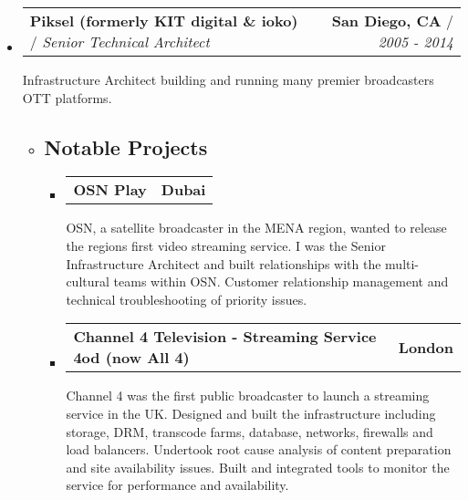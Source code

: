 \documentclass[10pt,a4paper]{article}
\makeatletter
\newcommand{\headerrow}[2]
{\begin{tabular*}{\linewidth}{l@{\extracolsep{\fill}}r}
	#1 &
	#2 \\
\end{tabular*}}
\makeatother
\begin{document}
\begin{itemize}

	\item[]
	\headerrow
    {\textbf{Piksel (formerly KIT digital \& ioko)} / \emph{Senior Technical Architect}}
    {\textbf{San Diego, CA} / \emph{2005 - 2014}}

  \vspace{+0.4em}
    Infrastructure Architect building and running many premier broadcasters OTT platforms.


    \begin{itemize}
      \item[]
      \subsection*{Notable Projects}
        \begin{itemize}
          \item
          \headerrow
              {\textbf{OSN Play}}
              {\textbf{Dubai}}
              OSN, a satellite broadcaster in the MENA region, wanted to release the regions first video streaming service. I was the Senior Infrastructure Architect and built relationships with the  multi-cultural teams within OSN.  Customer relationship management and technical troubleshooting of priority issues.

					\item
          \headerrow
              {\textbf{Channel 4 Television - Streaming Service 4od (now All 4)}}
              {\textbf{London}}
              Channel 4 was the first public broadcaster to launch a streaming service in the UK.  Designed and built the  infrastructure including storage, DRM, transcode farms, database, networks, firewalls and load balancers. Undertook root cause analysis of content preparation and site availability issues.  Built and integrated tools to monitor the service for performance and availability.


\end{itemize}
\end{itemize}
\end{itemize}
\end{document}
